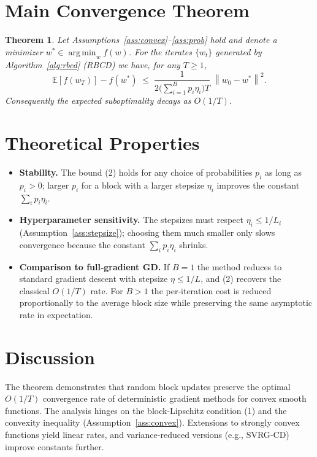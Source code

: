 \documentclass{article}
\newtheorem{theorem}{Theorem}
\newcommand{\E}{\mathbb{E}}
\newcommand{\norm}[1]{\left\|#1\right\|}
\newcommand{\argmin}{\operatorname*{arg\,min}}
\begin{document}
\section*{Main Convergence Theorem}
\begin{theorem}\label{thm:rate}
Let Assumptions~\ref{ass:convex}--\ref{ass:prob} hold and denote a minimizer
$w^{*}\in\argmin_{w}f(w)$.  For the iterates $\{w_t\}$ generated by
Algorithm~\ref{alg:rbcd} (RBCD) we have, for any $T\ge 1$,
\[
\E\!\left[f(w_T)\right]-f(w^{*})
\;\le\;
\frac{1}{2\bigl(\sum_{i=1}^{B}p_i\eta_i\bigr)T}
\;\norm{w_0-w^{*}}^{2}.
\tag{2}
\]
Consequently the expected suboptimality decays as $O(1/T)$.
\end{theorem}

\section*{Theoretical Properties}
\begin{itemize}
\item \textbf{Stability.} The bound (2) holds for any choice of
probabilities $p_i$ as long as $p_i>0$; larger $p_i$ for a block with a
larger stepsize $\eta_i$ improves the constant $\sum_i p_i\eta_i$.
\item \textbf{Hyperparameter sensitivity.} The stepsizes must respect
$\eta_i\le 1/L_i$ (Assumption~\ref{ass:stepsize}); choosing them much smaller
only slows convergence because the constant $\sum_i p_i\eta_i$ shrinks.
\item \textbf{Comparison to full‑gradient GD.} If $B=1$ the method reduces to
standard gradient descent with stepsize $\eta\le 1/L$, and (2) recovers the
classical $O(1/T)$ rate.  For $B>1$ the per‑iteration cost is reduced
proportionally to the average block size while preserving the same
asymptotic rate in expectation.
\end{itemize}

\section*{Discussion}
The theorem demonstrates that random block updates preserve the optimal
$O(1/T)$ convergence rate of deterministic gradient methods for convex smooth
functions.  The analysis hinges on the block‑Lipschitz condition (1) and
the convexity inequality (Assumption~\ref{ass:convex}).  Extensions to
strongly convex functions yield linear rates, and variance‑reduced
versions (e.g., SVRG‑CD) improve constants further.
\end{document}
